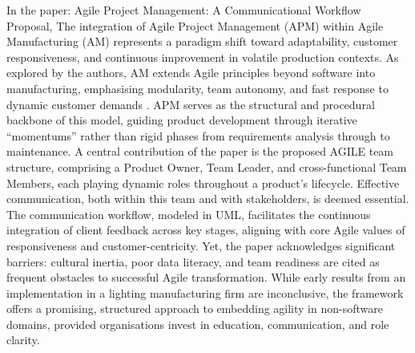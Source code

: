 \documentclass{report}
\begin{document}
In the paper: Agile Project Management: A Communicational Workflow Proposal, The integration of Agile Project Management (APM) within Agile Manufacturing (AM) represents a paradigm shift toward adaptability, customer responsiveness, and continuous improvement in volatile production contexts. As explored by the authors, AM extends Agile principles beyond software into manufacturing, emphasising modularity, team autonomy, and fast response to dynamic customer demands \parencite{loiroAgileProjectManagement2019}. APM serves as the structural and procedural backbone of this model, guiding product development through iterative “momentums” rather than rigid phases from requirements analysis through to maintenance.
A central contribution of the paper is the proposed AGILE team structure, comprising a Product Owner, Team Leader, and cross-functional Team Members, each playing dynamic roles throughout a product’s lifecycle. Effective communication, both within this team and with stakeholders, is deemed essential. The communication workflow, modeled in UML, facilitates the continuous integration of client feedback across key stages, aligning with core Agile values of responsiveness and customer-centricity.
Yet, the paper acknowledges significant barriers: cultural inertia, poor data literacy, and team readiness are cited as frequent obstacles to successful Agile transformation. While early results from an implementation in a lighting manufacturing firm are inconclusive, the framework offers a promising, structured approach to embedding agility in non-software domains, provided organisations invest in education, communication, and role clarity.
\end{document}
